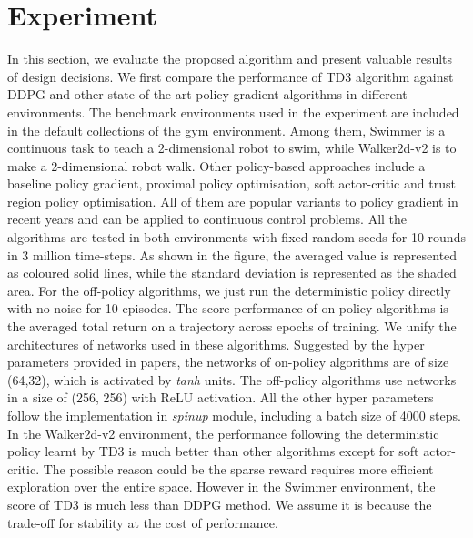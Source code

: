 \documentclass[oneside,11pt,a4paper]{article}
\begin{document}
\section{Experiment}
In this section, we evaluate the proposed algorithm and present valuable results of design decisions.
\newline
\newline
\noindent
We first compare the performance of TD3 algorithm against DDPG and other state-of-the-art policy gradient algorithms in different environments. The benchmark environments used in the experiment are included in the default collections of the gym environment. Among them, Swimmer is a continuous task to teach a 2-dimensional robot to swim, while Walker2d-v2 is to make a 2-dimensional robot walk. Other policy-based approaches include a baseline policy gradient, proximal policy optimisation, soft actor-critic and trust region policy optimisation. All of them are popular variants to policy gradient in recent years and can be applied to continuous control problems.
\newline
\newline
\noindent
All the algorithms are tested in both environments with fixed random seeds for 10 rounds in 3 million time-steps. As shown in the figure, the averaged value is represented as coloured solid lines, while the standard deviation is represented as the shaded area. For the off-policy algorithms, we just run the deterministic policy directly with no noise for 10 episodes. The score performance of on-policy algorithms is the averaged total return on a trajectory across epochs of training. We unify the architectures of networks used in these algorithms. Suggested by the hyper parameters provided in papers, the networks of on-policy algorithms are of size (64,32), which is activated by \textit{tanh} units. The off-policy algorithms use networks in a size of (256, 256) with ReLU activation. All the other hyper parameters follow the implementation in \textit{spinup} module, including a batch size of 4000 steps.
\newline
\newline
\noindent
In the Walker2d-v2 environment, the performance following the deterministic policy learnt by TD3 is much better than other algorithms except for soft actor-critic. The possible reason could be the sparse reward requires more efficient exploration over the entire space. However in the Swimmer environment, the score of TD3 is much less than DDPG method. We assume it is because the trade-off for stability at the cost of performance.
\end{document}
